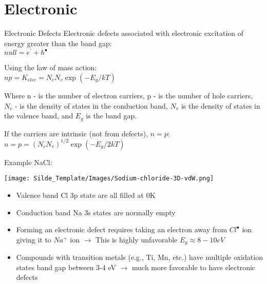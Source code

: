 \documentclass{libs/XJTLU_format}
\begin{document}
\section{Electronic}
\begin{frame}{Electronic Defects}
Electronic defects associated with electronic excitation of energy greater than the band gap:\\[0.1cm]

\centering
$null = e^{'} + h^{\bullet}$\\[6 pt]
\pause

\justifying
Using the law of mass action:\\[0.1cm]

\centering
$np = K_{elec} = N_c N_v \exp{(-E_g/kT)}$

\justifying
Where n - is the number of electron carriers, p - is the number of hole carriers, $N_c$ - is the density of states in the conduction band, $N_v$ is the density of states in the valence band, and $E_g$ is the band gap.\\[0.1cm]
\pause

If the carriers are intrinsic (not from defects), $n=p$:\\[6 pt]
\centering
$n=p=(N_c N_v)^{1/2}\exp{(-E_g/2kT)}$

\end{frame}

\begin{frame}{Example NaCl:}

\centering
\texttt{[image: Silde\_Template/Images/Sodium-chloride-3D-vdW.png]} \\[0.3cm] \pause

\begin{itemize}
    \item Valence band Cl 3p state are all filled at 0K 
    \item Conduction band Na 3s states are normally empty \pause
    \item Forming an electronic defect requires taking an electron away from $Cl^{\bullet}$ ion giving it to $Na^{+}$ ion $\rightarrow$ This is highly unfavorable $E_g \approx 8-10 eV$ \pause
    \item Compounds with transition metals (e.g., Ti, Mn, etc.) have multiple oxidation states band gap between 3-4 eV $\rightarrow$ much more favorable to have electronic defects
\end{itemize}
    
\end{frame}
\end{document}
